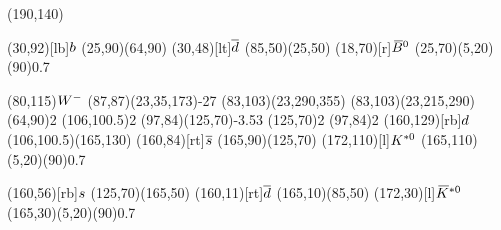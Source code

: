\documentclass{standalone}
\begin{document}
\begin{axopicture}(190,140)

  \Text(30,92)[lb]{${b}$}                     %
  \Line[arrow](25,90)(64,90)                      %
  \Text(30,48)[lt]{${\overline {{d}}}$}                  %
  \Line[arrow](85,50)(25,50)                      %
  \Text(18,70)[r]{${{\kern 0.18em\overline{\kern -0.18em B}}{}^0}$}                         %
  \GOval(25,70)(5,20)(90){0.7}                    %
                                                  
  \Text(80,115){\small{${W^-}$}}                    %
  \PhotonArc(87,87)(23,35,173){-2}{7}             %
  \Arc[arrow,arrowpos=0.60](83,103)(23,290,355)   %
  \Arc[arrow,arrowpos=0.60](83,103)(23,215,290)   %
  \Vertex(64,90){2}                               %
  \Vertex(106,100.5){2}                           %
  \Gluon(97,84)(125,70){-3.5}{3}                  %
  \Vertex(125,70){2}                              %
  \Vertex(97,84){2}                               %
  \Text(160,129)[rb]{${d}$}                   %
  \Line[arrow](106,100.5)(165,130)                %
  \Text(160,84)[rt]{${\overline {{s}}}$}                 %
  \Line[arrow](165,90)(125,70)                    %
  \Text(172,110)[l]{${{K}^{*0}}$}                    %
  \GOval(165,110)(5,20)(90){0.7}                  %
                                                  
  \Text(160,56)[rb]{${s}$}                    %
  \Line[arrow](125,70)(165,50)                    %
  \Text(160,11)[rt]{${\overline {{d}}}$}                 %
  \Line[arrow](165,10)(85,50)                     %
  \Text(172,30)[l]{${{\kern 0.18em\overline{\kern -0.18em K}}{}^{*0}}$}                    %
  \GOval(165,30)(5,20)(90){0.7}                   %
                                                  
\end{axopicture}
\end{document}

